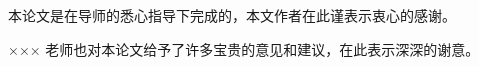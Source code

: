 \begin{thinking}
	\par 本论文是在导师的悉心指导下完成的，本文作者在此谨表示衷心的感谢。
	\par ××× 老师也对本论文给予了许多宝贵的意见和建议，在此表示深深的谢意。
\end{thinking}